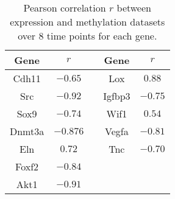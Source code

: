 \documentclass[10pt]{article}
\begin{document}
\begin{table}
\centering
\begin{tabular}{|c|c|c|c|c|}
\hline
Gene & $r$  & & Gene & $r$ \\
\hline
Cdh11 & $-0.65$ & & Lox & $0.88$ \\
\hline
Src & $-0.92$ & & Igfbp3 & $-0.75$ \\
\hline
Sox9 & $-0.74$ & & Wif1 & $0.54$ \\
\hline
Dnmt3a & $-0.876$ & & Vegfa & $-0.81$ \\
\hline
Eln & $0.72$ & & Tnc & $-0.70$ \\
\hline
Foxf2 & $-0.84$ & & & \\
\hline
Akt1 & $-0.91$ & & &  \\
\hline
\end{tabular}
\caption{Pearson correlation $r$  between expression and
  methylation datasets over $8$ time points for each gene.}
\label{tab:sup2}
\end{table}
\end{document}
